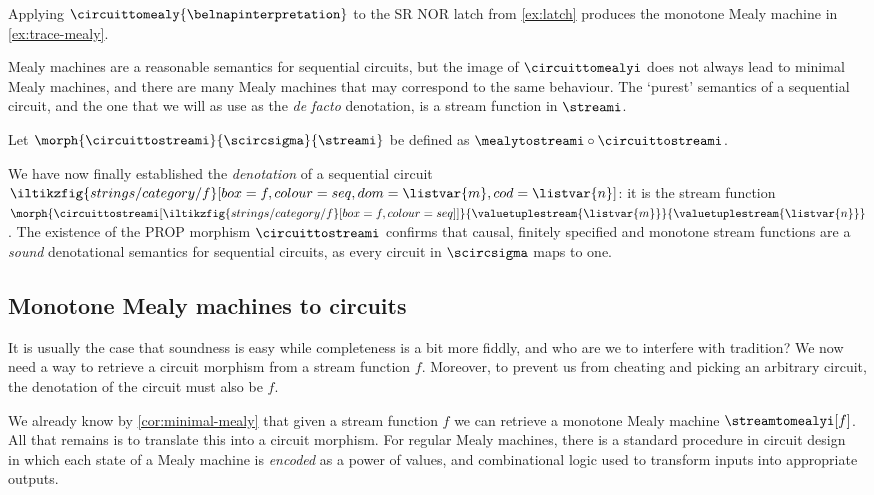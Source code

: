 \begin{example}\label{ex:mealy-translation}
    Applying \(\circuittomealy{\belnapinterpretation}\) to the SR NOR latch from
    \cref{ex:latch} produces the monotone Mealy machine in
    \cref{ex:trace-mealy}.
\end{example}

Mealy machines are a reasonable semantics for sequential circuits, but the
image of \(\circuittomealyi\) does not always lead to minimal Mealy machines,
and there are many Mealy machines that may correspond to the same behaviour.
The `purest' semantics of a sequential circuit, and the one that we will as use
as the \emph{de facto} denotation, is a stream function in \(\streami\).

\begin{definition}
    Let \(\morph{\circuittostreami}{\scircsigma}{\streami}\) be defined as
    \(\mealytostreami \circ \circuittostreami\).
\end{definition}

We have now finally established the \emph{denotation} of a sequential circuit \(
    \iltikzfig{strings/category/f}[box=f,colour=seq,dom=\listvar{m},cod=\listvar{n}]
\): it is the stream function \(
    \morph{\circuittostreami[\iltikzfig{strings/category/f}[box=f,colour=seq]]}{\valuetuplestream{\listvar{m}}}{\valuetuplestream{\listvar{n}}}
\).
The existence of the PROP morphism \(\circuittostreami\) confirms that causal,
finitely specified and monotone stream functions are a \emph{sound} denotational
semantics for sequential circuits, as every circuit in \(\scircsigma\)
maps to one.

\subsection{Monotone Mealy machines to circuits}

It is usually the case that soundness is easy while completeness is a bit more
fiddly, and who are we to interfere with tradition?
We now need a way to retrieve a circuit morphism from a stream
function \(f\).
Moreover, to prevent us from cheating and picking an arbitrary circuit, the
denotation of the circuit must also be \(f\).

We already know by \cref{cor:minimal-mealy} that given a stream function
\(f\) we can retrieve a monotone Mealy machine \(\streamtomealyi[f]\).
All that remains is to translate this into a circuit morphism.
For regular Mealy machines, there is a standard procedure in circuit
design~\cite{kohavi2009switching} in which each state of a Mealy machine is
\emph{encoded} as a power of values, and combinational logic used to transform
inputs into appropriate outputs.

